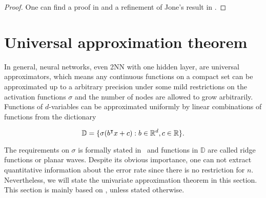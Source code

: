 \begin{proof}
    One can find a proof in \cite{jonesSimpleLemmaGreedy1992} and a refinement
    of Jone's result in \cite[Theorem
    5]{barronUniversalApproximationBounds1993}.    
\end{proof}


\section{Universal approximation theorem}
\label{sec:uat}

In general, neural networks, even 2NN with one hidden layer, are universal
approximators, which means any continuous functions on a compact set can be
approximated up to a arbitrary precision under some mild restrictions on the
activation functions $\sigma$ and the number of nodes are allowed to grow
arbitrarily. Functions of $d$-variables can be approximated uniformly by linear
combinations of functions from the dictionary

\begin{equation}
    \label{eq:uat_dict}
    \mathbb{D} = \{\sigma(b{}^{\intercal} x + c): b \in \mathbb{R}^d, c\in \mathbb{R} \}.
\end{equation}

The requirements on $\sigma$ is formally stated
in~\cite{cybenkoApproximationSuperpositionsSigmoidal1989} and functions in
$\mathbb{D}$ are called ridge functions or planar waves. Despite its obvious
importance, one can not extract quantitative information about the error rate
since there is no restriction for $n$. Nevertheless, we will state the
univariate approximation theorem in this section. This section is mainly based
on \cite{cybenkoApproximationSuperpositionsSigmoidal1989}, unless stated
otherwise.

